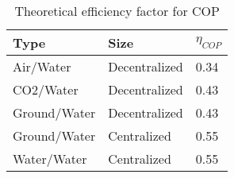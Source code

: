 \begin{table}[h!]
\centering
\caption{Theoretical efficiency factor for COP}\vspace{2mm}
\label{tab:etaCOP} 
\begin{tabular}{lll}
	\toprule
	Type         & Size          & $\eta_{COP}$ \\ \midrule
	Air/Water    & Decentralized & 0.34         \\
	CO2/Water    & Decentralized & 0.43         \\
	Ground/Water & Decentralized & 0.43         \\
	Ground/Water & Centralized   & 0.55         \\
	Water/Water  & Centralized   & 0.55        \\ \bottomrule
\end{tabular}
\end{table}
